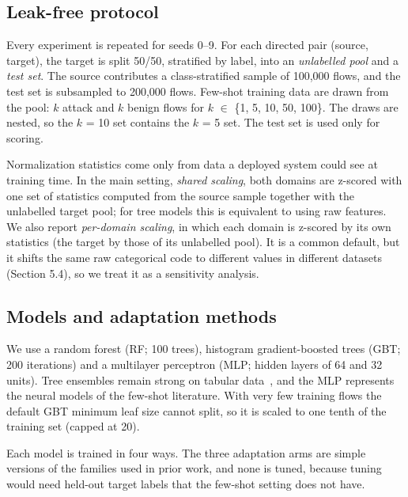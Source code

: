 \documentclass[11pt]{article}
\begin{document}
\subsection{Leak-free protocol}

Every experiment is repeated for seeds 0--9. For each directed pair (source, target), the target is split 50/50, stratified by label, into an \emph{unlabelled pool} and a \emph{test set}. The source contributes a class-stratified sample of 100,000 flows, and the test set is subsampled to 200,000 flows. Few-shot training data are drawn from the pool: $k$ attack and $k$ benign flows for $k$ $\in$ \{1, 5, 10, 50, 100\}. The draws are nested, so the $k$ = 10 set contains the $k$ = 5 set. The test set is used only for scoring.

Normalization statistics come only from data a deployed system could see at training time. In the main setting, \emph{shared scaling}, both domains are z-scored with one set of statistics computed from the source sample together with the unlabelled target pool; for tree models this is equivalent to using raw features. We also report \emph{per-domain scaling}, in which each domain is z-scored by its own statistics (the target by those of its unlabelled pool). It is a common default, but it shifts the same raw categorical code to different values in different datasets (Section 5.4), so we treat it as a sensitivity analysis.

\subsection{Models and adaptation methods}

We use a random forest (RF; 100 trees), histogram gradient-boosted trees (GBT; 200 iterations) and a multilayer perceptron (MLP; hidden layers of 64 and 32 units). Tree ensembles remain strong on tabular data~\cite{grinsztajn2022why}, and the MLP represents the neural models of the few-shot literature. With very few training flows the default GBT minimum leaf size cannot split, so it is scaled to one tenth of the training set (capped at 20).

Each model is trained in four ways. The three adaptation arms are simple versions of the families used in prior work, and none is tuned, because tuning would need held-out target labels that the few-shot setting does not have.
\end{document}
